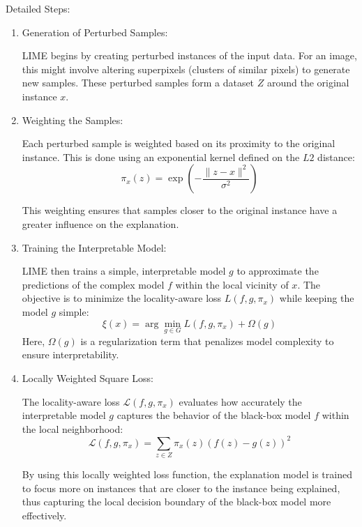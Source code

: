 \documentclass{article}
\begin{document}
Detailed Steps:
\begin{enumerate}
    \item Generation of Perturbed Samples: 
    
    LIME begins by creating perturbed instances of the input data. For an image, this might involve altering superpixels (clusters of similar pixels) to generate new samples. These perturbed samples form a dataset $Z$ around the original instance $x$.
    
    \item Weighting the Samples: 
    
    Each perturbed sample is weighted based on its proximity to the original instance. This is done using an exponential kernel defined on the $L2$ distance:
    \begin{equation}
    \pi_x(z) = \exp\left(-\frac{\|z - x\|^2}{\sigma^2}\right)
    \end{equation}
    
    This weighting ensures that samples closer to the original instance have a greater influence on the explanation.
    
    \item Training the Interpretable Model:
    
    LIME then trains a simple, interpretable model $g$ to approximate the predictions of the complex model $f$ within the local vicinity of $x$. The objective is to minimize the locality-aware loss $L(f, g, \pi_x)$ while keeping the model $g$ simple:
    \begin{equation}
    \xi(x) = \arg\min_{g \in G} L(f, g, \pi_x) + \Omega(g)    
    \end{equation}
    Here, $\Omega(g)$ is a regularization term that penalizes model complexity to ensure interpretability.
    
    \item Locally Weighted Square Loss:
    
    The locality-aware loss $\mathcal{L}(f, g, \pi_x)$ evaluates how accurately the interpretable model $g$ captures the behavior of the black-box model $f$ within the local neighborhood:
    \begin{equation}    
    \mathcal{L}(f, g, \pi_x) = \sum_{z \in Z} \pi_x(z)(f(z) - g(z))^2
    \end{equation}
    
    By using this locally weighted loss function, the explanation model is trained to focus more on instances that are closer to the instance being explained, thus capturing the local decision boundary of the black-box model more effectively.
    
\end{enumerate}
\end{document}
